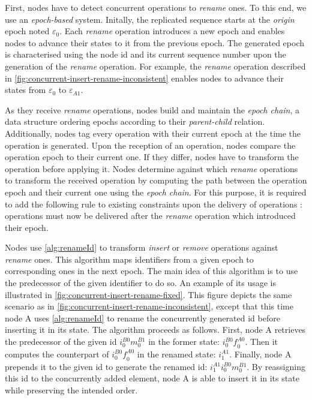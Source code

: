 \documentclass[10pt,journal,compsoc]{IEEEtran}
\newcommand{\trm}[1]{\mathit{#1}}
\newcommand{\id}[3]{$\trm{#1}^{\trm{#2}}_{\trm{#3}}$}
\newcommand{\epoch}[1]{$\varepsilon_{#1}$}
\begin{document}
First, nodes have to detect concurrent operations to \emph{rename} ones.
To this end, we use an \emph{epoch-based} system.
Initally, the replicated sequence starts at the \emph{origin} epoch noted \epoch{0}.
Each \emph{rename} operation introduces a new epoch and enables nodes to advance their states to it from the previous epoch.
The generated epoch is characterised using the node id and its current sequence number upon the generation of the \emph{rename} operation.
For example, the \emph{rename} operation described in \autoref{fig:concurrent-insert-rename-inconsistent} enables nodes to advance their states from \epoch{0} to \epoch{A1}.

As they receive \emph{rename} operations, nodes build and maintain the \emph{epoch chain}, a data structure ordering epochs according to their \emph{parent-child} relation.
Additionally, nodes tag every operation with their current epoch at the time the operation is generated.
Upon the reception of an operation, nodes compare the operation epoch to their current one.
If they differ, nodes have to transform the operation before applying it.
Nodes determine against which \emph{rename} operations to transform the received operation by computing the path between the operation epoch and their current one using the \emph{epoch chain}.
For this purpose, it is required to add the following rule to existing constraints upon the delivery of operations : operations must now be delivered after the \emph{rename} operation which introduced their epoch.

Nodes use \autoref{alg:renameId} to transform \emph{insert} or \emph{remove} operations against \emph{rename} ones.
This algorithm maps identifiers from a given epoch to corresponding ones in the next epoch.
The main idea of this algorithm is to use the predecessor of the given identifier to do so.
An example of its usage is illustrated in \autoref{fig:concurrent-insert-rename-fixed}.
This figure depicts the same scenario as in \autoref{fig:concurrent-insert-rename-inconsistent}, except that this time node A uses \autoref{alg:renameId} to rename the concurrently generated id before inserting it in its state.
The algorithm proceeds as follows.
First, node A retrieves the predecessor of the given id \id{i}{B0}{0}\id{m}{B1}{0} in the former state: \id{i}{B0}{0}\id{f}{A0}{0}.
Then it computes the counterpart of \id{i}{B0}{0}\id{f}{A0}{0} in the renamed state: \id{i}{A1}{1}.
Finally, node A prepends it to the given id to generate the renamed id: \id{i}{A1}{1}\id{i}{B0}{0}\id{m}{B1}{0}.
By reassigning this id to the concurrently added element, node A is able to insert it in its state while preserving the intended order.
\end{document}
